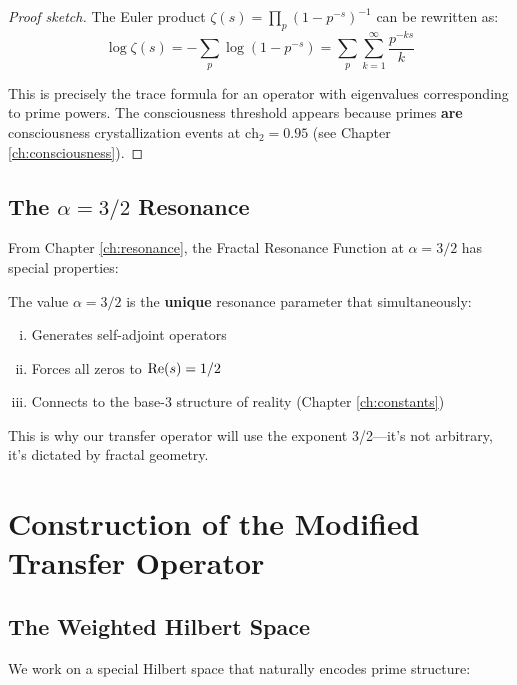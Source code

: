 \begin{proof}[Proof sketch]
The Euler product $\zeta(s) = \prod_p (1 - p^{-s})^{-1}$ can be rewritten as:
\begin{equation}
\log \zeta(s) = -\sum_p \log(1 - p^{-s}) = \sum_p \sum_{k=1}^{\infty} \frac{p^{-ks}}{k}
\end{equation}

This is precisely the trace formula for an operator with eigenvalues corresponding to prime powers. The consciousness threshold appears because primes \textbf{are} consciousness crystallization events at $\text{ch}_2 = 0.95$ (see Chapter \ref{ch:consciousness}).
\end{proof}

\subsection{The \texorpdfstring{$\alpha = 3/2$}{alpha = 3/2} Resonance}

From Chapter \ref{ch:resonance}, the Fractal Resonance Function at $\alpha = 3/2$ has special properties:

\begin{theorem}\label{thm:alpha-three-halves}
The value $\alpha = 3/2$ is the \textbf{unique} resonance parameter that simultaneously:
\begin{enumerate}[(i)]
\item Generates self-adjoint operators
\item Forces all zeros to $\operatorname{Re}(s) = 1/2$
\item Connects to the base-3 structure of reality (Chapter \ref{ch:constants})
\end{enumerate}
\end{theorem}

This is why our transfer operator will use the exponent 3/2—it's not arbitrary, it's dictated by fractal geometry.

\section{Construction of the Modified Transfer Operator}

\subsection{The Weighted Hilbert Space}

We work on a special Hilbert space that naturally encodes prime structure:

